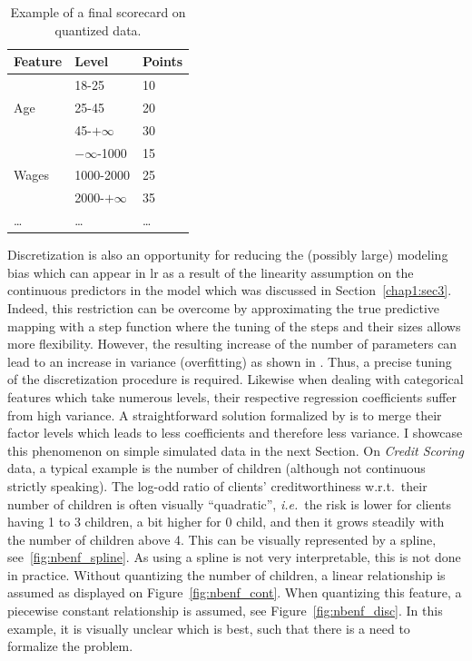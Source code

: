 \begin{table}
\centering
\caption{\label{tab:ex_scorecard} Example of a final scorecard on quantized data.}
\begin{tabular}{p{3cm}|p{3cm}|p{2cm}}
Feature & Level & Points \\
\hline
\hline
\multirow{3}{*}{Age} & 18-25 & 10 \\
 & 25-45 & 20 \\
 & 45-$+\infty$ & 30 \\
 \hline
\multirow{3}{*}{Wages} & $-\infty$-1000 & 15 \\
 & 1000-2000 & 25 \\
 & 2000-$+\infty$ & 35 \\
 \dots & \dots & \dots \\
\end{tabular}
\end{table}


Discretization is also an opportunity for reducing the (possibly large) modeling bias which can appear in \gls{lr} as a result of the linearity assumption on the continuous predictors in the model which was discussed in Section~\ref{chap1:sec3}. Indeed, this restriction can be overcome by approximating the true predictive mapping with a step function where the tuning of the steps and their sizes allows more flexibility. However, the resulting increase of the number of parameters can lead to an increase in variance (overfitting) as shown in \cite{yang2009discretization}. Thus, a precise tuning of the discretization procedure is required. Likewise when dealing with categorical features which take numerous levels, their respective regression coefficients suffer from high variance. A straightforward solution formalized by \cite{maj2015delete} is to merge their factor levels which leads to less coefficients and therefore less variance. I showcase this phenomenon on simple simulated data in the next Section. On \textit{Credit Scoring} data, a typical example is the number of children (although not continuous strictly speaking). The log-odd ratio of clients' creditworthiness w.r.t.\ their number of children is often visually ``quadratic'', \textit{i.e.}\ the risk is lower for clients having 1 to 3 children, a bit higher for 0 child, and then it grows steadily with the number of children above 4. This can be visually represented by a spline, see~\ref{fig:nbenf_spline}. As using a spline is not very interpretable, this is not done in practice. Without quantizing the number of children, a linear relationship is assumed as displayed on Figure~\ref{fig:nbenf_cont}. When quantizing this feature, a piecewise constant relationship is assumed, see Figure~\ref{fig:nbenf_disc}. In this example, it is visually unclear which is best, such that there is a need to formalize the problem.

